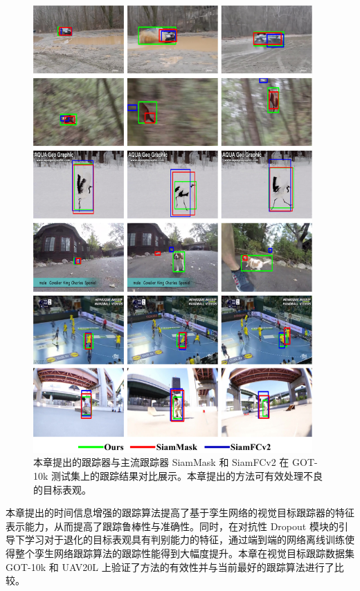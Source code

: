 \begin{figure}[p]
    \centering
    \includegraphics[width=0.95\textwidth]{Img/end/visulization.pdf}
    \caption{本章提出的跟踪器与主流跟踪器 SiamMask \cite{Wang2018SiamMask} 和 SiamFCv2 \cite{SiamFC} 在 GOT-10k \cite{GOT-10k} 测试集上的跟踪结果对比展示。本章提出的方法可有效处理不良的目标表观。}
    \label{fig:end_vis}
\end{figure}

本章提出的时间信息增强的跟踪算法提高了基于孪生网络的视觉目标跟踪器的特征表示能力，从而提高了跟踪鲁棒性与准确性。同时，在对抗性 Dropout 模块的引导下学习对于退化的目标表观具有判别能力的特征，通过端到端的网络离线训练使得整个孪生网络跟踪算法的跟踪性能得到大幅度提升。本章在视觉目标跟踪数据集 GOT-10k \cite{GOT-10k} 和 UAV20L \cite{mueller2016benchmark} 上验证了方法的有效性并与当前最好的跟踪算法进行了比较。
